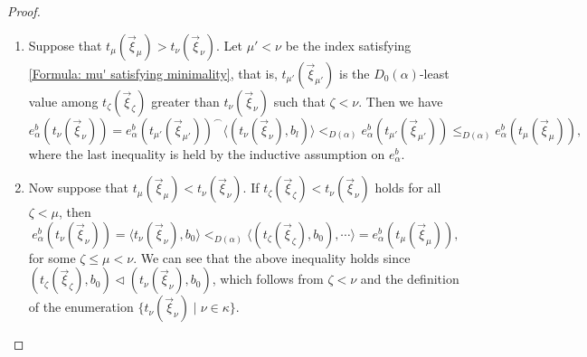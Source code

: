\documentclass{mhkr}
\newcommand{\lag}{\langle}
\newcommand{\rag}{\rangle}
\begin{document}
\begin{proof}
    \begin{enumerate}
        \item Suppose that $t_\mu(\vec{\xi}_\mu) > t_\nu(\vec{\xi}_\nu)$. Let $\mu'<\nu$ be the index satisfying \eqref{Formula: mu' satisfying minimality}, that is, $t_{\mu'}(\vec{\xi}_{\mu'})$ is the $D_0(\alpha)$-least value among $t_\zeta(\vec{\xi}_\zeta)$ greater than $t_\nu(\vec{\xi}_\nu)$ such that $\zeta<\nu$.
        Then we have
        \begin{equation*}
            e^b_\alpha(t_\nu(\vec{\xi}_\nu)) = e^b_\alpha(t_{\mu'}(\vec{\xi}_{\mu'})) ^\frown \lag (t_\nu(\vec{\xi}_\nu), b_{l})\rag <_{D(\alpha)} e^b_\alpha(t_{\mu'}(\vec{\xi}_{\mu'})) \le_{D(\alpha)} e^b_\alpha(t_\mu(\vec{\xi}_\mu)),
        \end{equation*}
        where the last inequality is held by the inductive assumption on $e^b_\alpha$.

        \item Now suppose that $t_\mu(\vec{\xi}_\mu) < t_\nu(\vec{\xi}_\nu)$. If $t_\zeta(\vec{\xi}_\zeta) < t_\nu(\vec{\xi}_\nu)$ holds for all $\zeta<\mu$, then
        \begin{equation*}
            e^b_\alpha(t_\nu(\vec{\xi}_\nu))=\lag t_\nu(\vec{\xi}_\nu) , b_{0}\rag <_{D(\alpha)} \lag(t_\zeta(\vec{\xi}_\zeta),b_{0}),\cdots \rag = e^b_\alpha(t_\mu(\vec{\xi}_\mu)),
        \end{equation*}
        for some $\zeta\le \mu<\nu$. We can see that the above inequality holds since $(t_\zeta(\vec{\xi}_\zeta),b_{0}) \vartriangleleft (t_\nu(\vec{\xi}_\nu),b_{0})$, which follows from $\zeta<\nu$ and the definition of the enumeration $\{t_\nu(\vec{\xi}_\nu)\mid \nu\in\kappa\}$.
        

\end{enumerate}
\end{proof}
\end{document}
